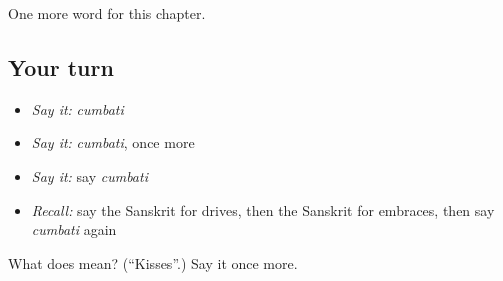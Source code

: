 \begin{grammarlens}[title={What you've built}]
One more word for this chapter.
\end{grammarlens}

\subsection*{Your turn}
\begin{itemize}
\raggedright
  \item \emph{Say it:} \emph{cumbati}
  \item \emph{Say it:} \emph{cumbati}, once more
  \item \emph{Say it:} say \emph{cumbati}
  \item \emph{Recall:} say the Sanskrit for drives, then the Sanskrit for embraces, then say \emph{cumbati} again
\end{itemize}

\begin{tcolorbox}[breakable,colback=teal!4,colframe=teal!35!black,title={Before you move on}]
What does  mean? (\textquotedblleft{}Kisses\textquotedblright{}.) Say it once more.
\end{tcolorbox}
